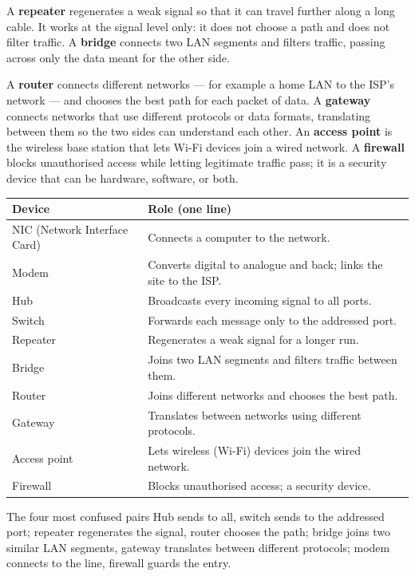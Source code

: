 A \textbf{repeater} regenerates a weak signal so that it can travel further
along a long cable. It works at the signal level only: it does not choose a
path and does not filter traffic. A \textbf{bridge} connects two LAN
segments and filters traffic, passing across only the data meant for the
other side.

A \textbf{router} connects different networks --- for example a home LAN to
the ISP's network --- and chooses the best path for each packet of data. A
\textbf{gateway} connects networks that use different protocols or data
formats, translating between them so the two sides can understand each
other. An \textbf{access point} is the wireless base station that lets Wi-Fi
devices join a wired network. A \textbf{firewall} blocks unauthorised access
while letting legitimate traffic pass; it is a security device that can be
hardware, software, or both.

\begin{center}
\begin{tabular}{p{}p{}}
\toprule
\textbf{Device} & \textbf{Role (one line)} \\
\midrule
NIC (Network Interface Card) & Connects a computer to the network. \\
Modem & Converts digital to analogue and back; links the site to the ISP. \\
Hub & Broadcasts every incoming signal to all ports. \\
Switch & Forwards each message only to the addressed port. \\
Repeater & Regenerates a weak signal for a longer run. \\
Bridge & Joins two LAN segments and filters traffic between them. \\
Router & Joins different networks and chooses the best path. \\
Gateway & Translates between networks using different protocols. \\
Access point & Lets wireless (Wi-Fi) devices join the wired network. \\
Firewall & Blocks unauthorised access; a security device. \\
\bottomrule
\end{tabular}
\end{center}

\begin{definitionbox}{The four most confused pairs}
Hub sends to all, switch sends to the addressed port; repeater regenerates
the signal, router chooses the path; bridge joins two similar LAN segments,
gateway translates between different protocols; modem connects to the line,
firewall guards the entry.
\end{definitionbox}

